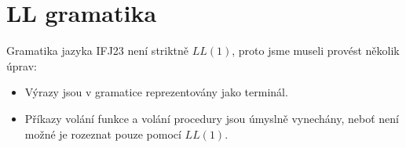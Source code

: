\section{LL gramatika}

Gramatika jazyka IFJ23 není striktně $LL(1)$, proto jsme museli provést několik úprav:

\begin{itemize}

\item Výrazy jsou v gramatice reprezentovány jako terminál.
\item Příkazy volání funkce a volání procedury jsou úmyslně vynechány,
neboť není možné je rozeznat pouze pomocí $LL(1)$.

\end{itemize}
